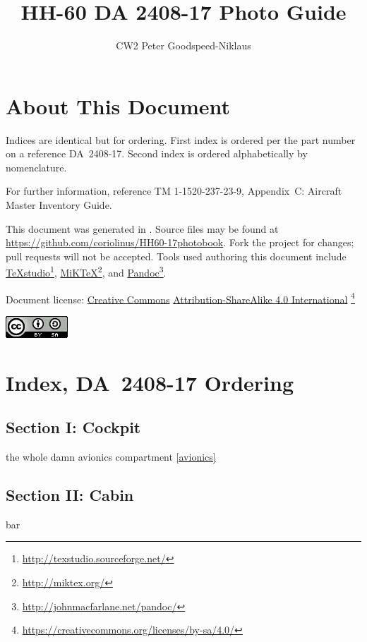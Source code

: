 \documentclass[letterpaper,11pt,openany,oneside]{book}
\author{CW2 Peter Goodspeed-Niklaus}
\title{HH-60 DA 2408-17 Photo Guide}
\begin{document}
\frontmatter
\maketitle
\clearpage
\setcounter{page}{1}
\chapter*{About This Document}
Indices are identical but for ordering. First index is ordered per the part number on a reference DA~2408-17. Second index is ordered alphabetically by nomenclature.

For further information, reference TM 1-1520-237-23-9, Appendix~C: Aircraft Master Inventory Guide.

This document was generated in \LaTeXe. Source files may be found at \url{https://github.com/coriolinus/HH60-17photobook}. Fork the project for changes; pull requests will not be accepted. Tools used authoring this document include \href{http://texstudio.sourceforge.net/}{TeXstudio}\footnote{\url{http://texstudio.sourceforge.net/}}, \href{http://miktex.org/}{MiKTeX}\footnote{\url{http://miktex.org/}}, and \href{http://johnmacfarlane.net/pandoc/}{Pandoc}\footnote{\url{http://johnmacfarlane.net/pandoc/}}.

Document license: \href{https://creativecommons.org/}{Creative Commons} \href{https://creativecommons.org/licenses/by-sa/4.0/}{Attribution-ShareAlike 4.0 International}
\footnote{\url{https://creativecommons.org/licenses/by-sa/4.0/}}

\begin{center}
	\href{https://creativecommons.org/licenses/by-sa/4.0/}{\includegraphics{Images/cc-by-sa.png}}
\end{center}

\mainmatter
\chapter*{Index, DA~2408-17 Ordering}
\section*{Section I: Cockpit}
the whole damn avionics compartment \ref{avionics}
\section*{Section II: Cabin}
bar
\end{document}

